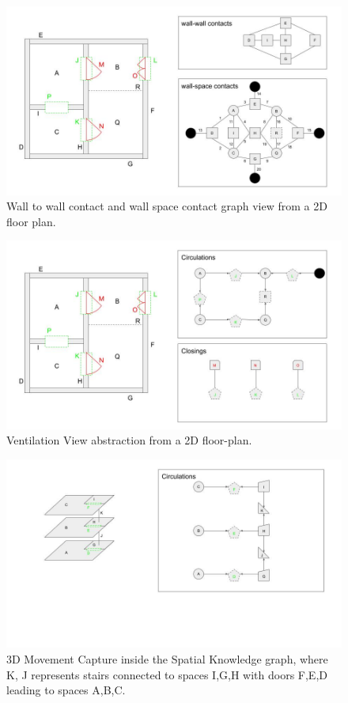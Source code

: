 \documentclass[conference]{IEEEtran}
\begin{document}
\begin{figure}
\centering
  \includegraphics[width=0.99\linewidth]{./img/wallSpace.jpg}
  \caption{ Wall to wall contact and wall space contact graph view from a 2D floor plan. }
  \label{fig:wallSpace}
\end{figure}


\begin{figure}
\centering
  \includegraphics[width=0.99\linewidth]{./img/circulationView.jpg}
  \caption{  Ventilation View abstraction from a 2D floor-plan.  }
  \label{fig:circulationView}
\end{figure}

\begin{figure}
\centering
  \includegraphics[width=0.99\linewidth]{./img/3dtraversal.jpg}
  \caption{ 3D Movement Capture inside the Spatial Knowledge graph, where K, J represents stairs connected to spaces I,G,H with doors F,E,D leading to spaces A,B,C. }
  \label{fig:3dtraversal}
\end{figure}
\end{document}
